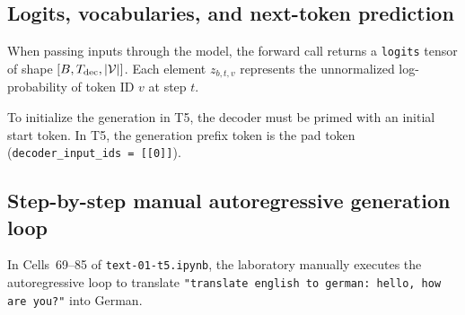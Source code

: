 \documentclass[../labs.tex]{subfiles}
\begin{document}
\subsection{Logits, vocabularies, and next-token prediction}

When passing inputs through the model, the forward call returns a \texttt{logits} tensor of shape $[B, T_{\text{dec}}, |\mathcal{V}|]$. Each element $z_{b, t, v}$ represents the unnormalized log-probability of token ID $v$ at step $t$.

To initialize the generation in T5, the decoder must be primed with an initial start token. In T5, the generation prefix token is the pad token (\texttt{decoder\_input\_ids = [[0]]}).

\subsection{Step-by-step manual autoregressive generation loop}

In Cells~69--85 of \texttt{text-01-t5.ipynb}, the laboratory manually executes the autoregressive loop to translate \texttt{"translate english to german: hello, how are you?"} into German.
\end{document}
